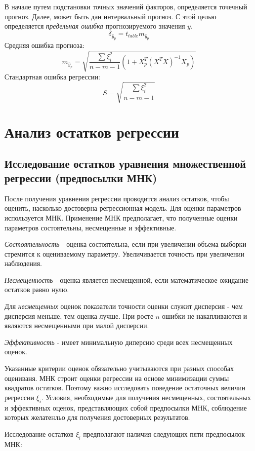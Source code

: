 \documentclass[aps,%
12pt,%
final,%
oneside,
onecolumn,%
musixtex, %
superscriptaddress,%
centertags]{article} %
\theoremstyle{plain}
\theoremstyle{definition}
\theoremstyle{remark}
\begin{document}
В начале путем подстановки точных значений факторов, определяется точечный прогноз. Далее, может быть дан интервальный прогноз. С этой целью определяется \textit{предельная ошибка} прогнозируемого значения $y$.
$$ \delta_{\hat{y}_p} = t_{table} m_{\hat{y}_p}$$
Средняя ошибка прогноза:
$$m_{\hat{y}_p}  = \sqrt{\frac{\sum \xi_i^2}{n-m-1} (1+X_p^T(X^T X)^{-1}X_p)}$$
Стандартная ошибка регрессии:
$$S =\sqrt{\frac{\sum \xi_i^2}{n-m-1}}$$

\newpage
\section{Анализ остатков регрессии}

\subsection{Исследование остатков уравнения множественной регрессии (предпосылки МНК)}

После получения уравнения регрессии проводится анализ остатков, чтобы оценить, насколько достоверна регрессионная модель. Для оценки параметров используется МНК. Применение МНК предполагает, что полученные оценки параметров состоятельны, несмещенные и эффективные.

\textit{Состоятельность} - оценка состоятельна, если при увеличении объема выборки стремится к оцениваемому параметру. Увеличивается точность при увеличении наблюдения.

\textit{Несмещенность} - оценка является несмещенной, если математическое ожидание остатков равно нулю.

Для \textit{несмещенных} оценок показатели точности оценки служит дисперсия - чем дисперсия меньше, тем оценка лучше. При росте $n$ ошибки не накапливаются и являются несмещенными при малой дисперсии.

\textit{Эффективность} - имеет минимальную диперсию среди всех несмещенных оценок.

Указанные критерии оценок обязательно учитываются при разных способах оцениваня. МНК строит оценки регрессии на основе минимизации суммы квадратов остатков. Поэтому важно исследовать поведение остаточных величин регрессии $\xi_i$. Условия, необходимые для получения несмещенных, состоятельных и эффективных оценок, представляющих собой предпосылки МНК, соблюдение которых желатенльо для получения достоверных результатов.

Исследование остатков $\xi_i$ предполагают наличия следующих пяти предпосылок МНК:
\end{document}
